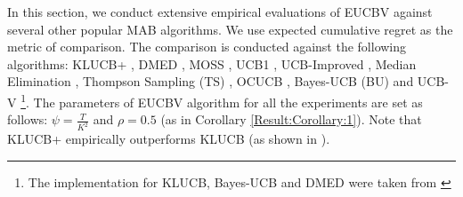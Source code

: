 In this section, we conduct extensive empirical evaluations of EUCBV against several other popular MAB  algorithms. We use expected cumulative regret as the metric of comparison. The comparison is conducted against the following algorithms: KLUCB+ \citep{garivier2011kl}, DMED \citep{honda2010asymptotically}, MOSS \citep{audibert2009minimax}, UCB1 \citep{auer2002finite}, UCB-Improved \citep{auer2010ucb}, Median Elimination \citep{even2006action}, Thompson Sampling (TS) \citep{agrawal2011analysis}, OCUCB \citep{lattimore2015optimally}, Bayes-UCB (BU) \citep{kaufmann2012bayesian} and UCB-V \citep{audibert2009exploration}\footnote{The implementation for KLUCB, Bayes-UCB and DMED were taken from \citet{CapGarKau12}}. The parameters of EUCBV algorithm for all the experiments are set as follows: $\psi=\frac{T}{K^2}$ and $\rho =0.5$ (as in Corollary \ref{Result:Corollary:1}). Note that KLUCB+ empirically outperforms KLUCB (as shown in \citet{garivier2011kl}).

